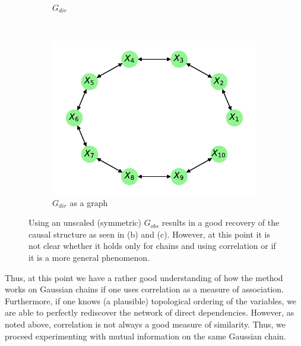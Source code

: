 \documentclass[../Thesis.tex]{subfiles}
\begin{document}
\begin{figure}[h]
\begin{subfigure}[t]{0.49\textwidth}
        \caption{$G_{dir}$}
        \label{subfig:Gaussian chain symmetric G_obs using correlation - G_dir - unscaled}
    \end{subfigure}
    \\[\baselineskip]
    \begin{subfigure}[t]{0.49\textwidth}
        \centering
        \includegraphics[width=.9\linewidth]{figures/Gaussian Chain Theoretical/Chain graph from symmetric G obs - unscaled.pdf}
        \caption{$G_{dir}$ as a graph}
    \end{subfigure}
    \caption{Using an unscaled (symmetric) $G_{obs}$ results in a good recovery of the causal structure as seen in (b) and (c). However, at this point it is not clear whether it holds only for chains and using correlation or if it is a more general phenomenon.}
    \label{fig:Gaussian chain symmetric G_obs using correlation - unscaled}
\end{figure}
Thus, at this point we have a rather good understanding of how the method works on Gaussian chains if one uses correlation as a measure of association. Furthermore, if one knows (a plausible) topological ordering of the variables, we are able to perfectly rediscover the network of direct dependencies. However, as noted above, correlation is not always a good measure of similarity. Thus, we proceed experimenting with mutual information on the same Gaussian chain.

\end{document}
